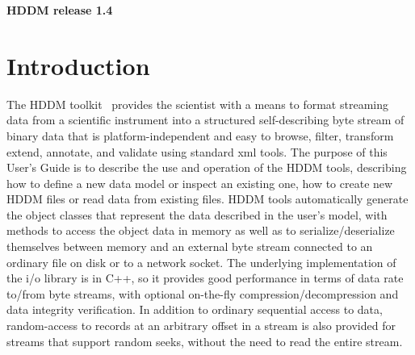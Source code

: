 \documentclass{revtex4}
\begin{document}
%
%
%
%

\begin{center}
{\bf HDDM release 1.4}
\end{center}

\newpage
\tableofcontents
\newpage
\section{Introduction}

The HDDM toolkit~\cite{github-hddm}
provides the scientist with a means to format streaming data
from a scientific instrument into a structured self-describing byte stream of
binary data that is platform-independent and easy to browse, filter, transform
extend, annotate, and validate using standard xml tools. The purpose of this 
User's Guide is to describe the use and operation of the HDDM tools, describing
how to define a new data model or inspect an existing one, how to create new
HDDM files or read data from existing files. HDDM tools automatically generate
the object classes that represent the data described in the user's model, with
methods to access the object data in memory as well as to serialize/deserialize
themselves between memory and an external byte stream connected to an ordinary
file on disk or to a network socket. The underlying implementation of the i/o
library is in C++, so it provides good performance in terms of data rate to/from
byte streams, with optional on-{}the-{}fly compression/decompression and data 
integrity verification. In addition to ordinary sequential access to data,
random-{}access to records at an arbitrary offset in a stream is also provided
for streams that support random seeks, without the need to read the entire stream.
\end{document}
